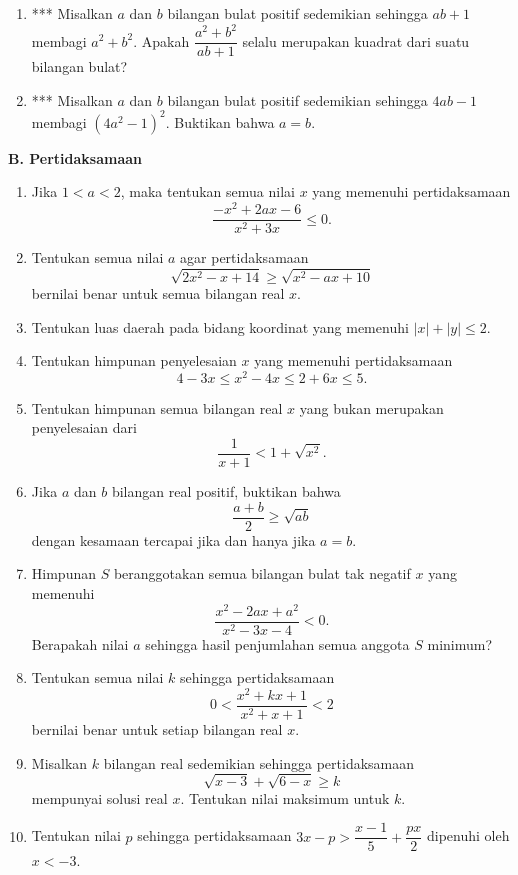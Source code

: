 \documentclass[12pt]{article}
\begin{document}
\begin{enumerate}[leftmargin=*]
		\item*** Misalkan $ a $ dan $ b $ bilangan bulat positif sedemikian sehingga $ ab + 1 $ membagi $ a^{2} + b^{2} $. Apakah $ \dfrac{a^{2} + b^{2}}{ab + 1} $ selalu merupakan kuadrat dari suatu bilangan bulat?
		\item*** Misalkan $ a $ dan $ b $ bilangan bulat positif sedemikian sehingga $ 4ab - 1 $ membagi $ \left(4a^{2} - 1\right)^{2} $. Buktikan bahwa $ a = b $.
	\end{enumerate}
	
	\newpage
	
	\noindent \textbf{B. Pertidaksamaan}
	\begin{enumerate}[leftmargin=*]
		\item Jika $ 1 < a < 2 $, maka tentukan semua nilai $ x $ yang memenuhi pertidaksamaan
		\[ \frac{-x^{2} + 2ax - 6}{x^{2} + 3x} \leq 0. \]
		\item Tentukan semua nilai $ a $ agar pertidaksamaan
		\[ \sqrt{2x^{2} - x + 14} \geq \sqrt{x^{2} - ax + 10} \]
		bernilai benar untuk semua bilangan real $ x $.
		\item Tentukan luas daerah pada bidang koordinat yang memenuhi $ \left|x\right| + \left|y\right| \leq 2 $.
		\item Tentukan himpunan penyelesaian $ x $ yang memenuhi pertidaksamaan
		\[ 4 - 3x \leq x^{2} - 4x \leq 2 + 6x \leq 5. \]
		\item Tentukan himpunan semua bilangan real $ x $ yang bukan merupakan penyelesaian dari
		\[ \frac{1}{x + 1} < 1 + \sqrt{x^{2}}. \]
		\item Jika $ a $ dan $ b $ bilangan real positif, buktikan bahwa
		\[ \frac{a + b}{2} \geq \sqrt{ab} \]
		dengan kesamaan tercapai jika dan hanya jika $ a = b $.
		\item Himpunan $ S $ beranggotakan semua bilangan bulat tak negatif $ x $ yang memenuhi
		\[ \frac{x^{2} - 2ax + a^{2}}{x^{2} - 3x - 4} < 0. \]
		Berapakah nilai $ a $ sehingga hasil penjumlahan semua anggota $ S $ minimum?
		\item Tentukan semua nilai $ k $ sehingga pertidaksamaan
		\[ 0 < \frac{x^{2} + kx + 1}{x^{2} + x + 1} < 2 \]
		bernilai benar untuk setiap bilangan real $ x $.
		\item Misalkan $ k $ bilangan real sedemikian sehingga pertidaksamaan
		\[ \sqrt{x - 3} + \sqrt{6 - x} \geq k \]
		mempunyai solusi real $ x $. Tentukan nilai maksimum untuk $ k $.
		\item Tentukan nilai $ p $ sehingga pertidaksamaan $ 3x - p > \dfrac{x - 1}{5} + \dfrac{px}{2} $ dipenuhi oleh $ x < -3 $.

\end{enumerate}
\end{document}
